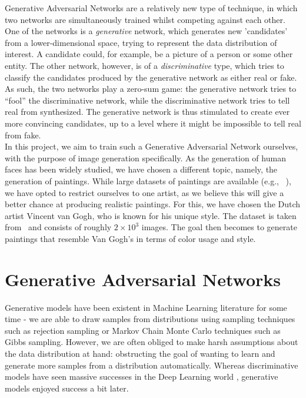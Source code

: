 \documentclass{article}
\begin{document}

Generative Adversarial Networks are a relatively new type of technique, in which two networks are simultaneously trained whilst competing against each other. One of the networks is a \textit{generative} network, which generates new 'candidates' from a lower-dimensional space, trying to represent the data distribution of interest. A candidate could, for example, be a picture of a person or some other entity. The other network, however, is of a \textit{discriminative} type, which tries to classify the candidates produced by the generative network as either real or fake. As such, the two networks play a zero-sum game: the generative network tries to ``fool'' the discriminative network, while the discriminative network tries to tell real from synthesized. The generative network is thus stimulated to create ever more convincing candidates, up to a level where it might be impossible to tell real from fake.\\

In this project, we aim to train such a Generative Adversarial Network ourselves, with the purpose of image generation specifically. As the generation of human faces has been widely studied, we have chosen a different topic, namely, the generation of paintings. While large datasets of paintings are available (e.g., ~\cite{kaggle_rijksmuseum}), we have opted to restrict ourselves to one artist, as we believe this will give a better chance at producing realistic paintings. For this, we have chosen the Dutch artist Vincent van Gogh, who is known for his unique style. The dataset is taken from~\cite{kaggle_van_gogh} and consists of roughly $2 \times 10^3$ images. The goal then becomes to generate paintings that resemble Van Gogh's in terms of color usage and style.\\

\section{Generative Adversarial Networks}\label{sec:GANs}
Generative models have been existent in Machine Learning literature for some time - we are able to draw samples from distributions using sampling techniques such as rejection sampling or Markov Chain Monte Carlo techniques such as Gibbs sampling. However, we are often obliged to make harsh assumptions about the data distribution at hand: obstructing the goal of wanting to learn and generate more samples from a distribution automatically. Whereas discriminative models have seen massive successes in the Deep Learning world \cite{hinton2012deep}, generative models enjoyed success a bit later.
\end{document}
